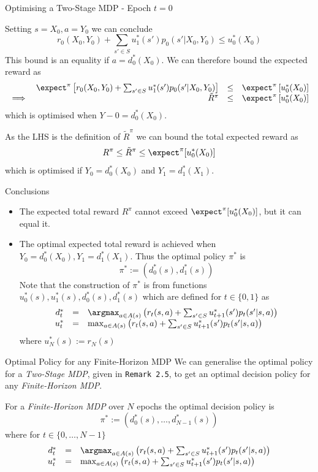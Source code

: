 \documentclass[11pt,a4paper]{article}
\begin{document}
\begin{proposition}{Optimising a Two-Stage MDP - Epoch $t=0$}
    \par Setting $s=X_0,a=Y_0$ we can conclude
    \[ r_0(X_0,Y_0)+\sum_{s'\in S}u_1^*(s')p_0(s'|X_0,Y_0)\leq u_0^*(X_0) \]
    This bound is an equality if $a=d_0^*(X_0)$. We can therefore bound the expected reward as
    \[\begin{array}{rrcl}
      &\expect^\pi\left[r_0(X_0,Y_0)+\sum_{s'\in S}u_1^*(s')p_0(s'|X_0,Y_0)\right]&\leq&\expect^\pi\left[u_0^*(X_0)\right]\\
      \implies&\tilde{R}^\pi&\leq&\expect^\pi\left[u_0^*(X_0)\right]
    \end{array}\]
    which is optimised when $Y-0=d_0^*(X_0)$.
    \par As the LHS is the definition of $\tilde{R}^\pi$ we can bound the total expected reward as
    \[ R^\pi\leq\tilde{R}^\pi\leq\expect^\pi[u_0^*(X_0)] \]
    which is optimised if $Y_0=d_0^*(X_0)$ and $Y_1=d_1^*(X_1)$.
  \end{proposition}

  \begin{remark}{Conclusions}
    \begin{itemize}
      \item The expected total reward $R^\pi$ cannot exceed $\expect^\pi[u_0^*(X_0)]$, but it can equal it.
      \item The optimal expected total reward is achieved when $Y_0=d_0^*(X_0),Y_1=d_1^*(X_1)$. Thus the optimal policy $\pi^*$ is
      \[ \pi^*:=(d_0^*(s),d_1^*(s)) \]
      Note that the construction of $\pi^*$ is from functions $u_0^*(s),u_1^*(s),d_0^*(s),d_1^*(s)$ which are defined for $t\in\{0,1\}$ as
      \[\begin{array}{rcl}
        d_t^*&=&\argmax_{a\in A(s)}\left(r_t(s,a)+\sum_{s'\in S}u_{t+1}^*(s')p_t(s'|s,a)\right)\\
        u_t^*&=&\max_{a\in A(s)}\left(r_t(s,a)+\sum_{s'\in S}u_{t+1}^*(s')p_t(s'|s,a)\right)
      \end{array}\]
      where $u_N^*(s):=r_N(s)$
    \end{itemize}
  \end{remark}

  \begin{remark}{Optimal Policy for any Finite-Horizon MDP}
    We can generalise the optimal policy for a \textit{Two-Stage MDP}, given in \texttt{Remark 2.5}, to get an optimal decision policy for any \textit{Finite-Horizon MDP}.
    \par For a \textit{Finite-Horizon MDP} over $N$ epochs the optimal decision policy is
    \[ \pi^*:=(d_0^*(s),\dots,d_{N-1}^*(s)) \]
    where for $t\in\{0,\dots,N-1\}$
    \[\begin{array}{rcl}
      d_t^*&=&\argmax_{a\in A(s)}\left(r_t(s,a)+\sum_{s'\in S}u_{t+1}^*(s')p_t(s'|s,a)\right)\\
      u_t^*&=&\max_{a\in A(s)}\left(r_t(s,a)+\sum_{s'\in S}u_{t+1}^*(s')p_t(s'|s,a)\right)
    \end{array}\]
  \end{remark}
\end{document}
